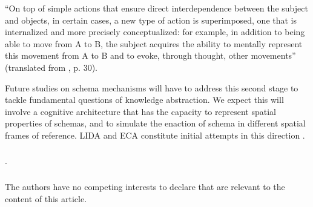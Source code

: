\documentclass[runningheads]{llncs}
\begin{document}
\begin{adjustwidth}{1cm}{1cm}
``On top of simple actions that ensure direct interdependence between the subject and objects, in certain cases, a new type of action is superimposed, one that is internalized and more precisely conceptualized: for example, in addition to being able to move from A to B, the subject acquires the ability to mentally represent this movement from A to B and to evoke, through thought, other movements'' (translated from \cite{piaget_lepistemologie_2011}, p. 30).\\

\end{adjustwidth}

Future studies on schema mechanisms will have to address this second stage to tackle fundamental questions of knowledge abstraction. 
We expect this will involve a cognitive architecture that has the capacity to represent spatial properties of schemas, and to simulate the enaction of schema in different spatial frames of reference. LIDA and ECA \cite{georgeon_artificial_2024} constitute initial attempts in this direction . 


\begin{credits}
\subsubsection{\ackname} .

\subsubsection{\discintname}
The authors have no competing interests to declare that are
relevant to the content of this article.
\end{credits}
%
%
%


%
\end{document}
